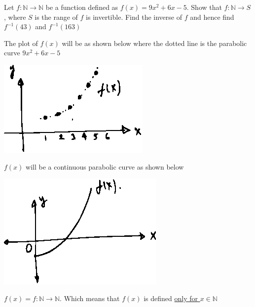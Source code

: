 \documentclass[14pt,fleqn]{extarticle}
\newcommand\N{\mathbb{N}}
\newcommand\fx{9x^2+6x-5}
\begin{document}
 
\begin{question}
	\statement 

Let $f:\N\to\N$ be a function defined as $f(x) = \fx$. Show that 
$f:\N\to S$, where $S$ is the range of $f$ is invertible. Find the 
inverse of $f$ and hence find $f^{-1}(43)$ and $f^{-1}(163)$ 
      
      \begin{step}
  \begin{options} 
     \correct 
       
       The plot of $f(x)$ will be as shown below where the dotted line 
       is the parabolic curve $\fx$ 
       
       \begin{center}
\includegraphics[scale=1.5]{1427-C.eps}
\end{center}
       
     \incorrect
     
     $f(x)$ will be a continuous parabolic curve as shown below 
     
     \begin{center}
\includegraphics[scale=1.5]{1427-A.eps}
\end{center}
        
    \end{options} 
     \reason 
     
     $f(x) = f:\N\to\N$. Which means that $f(x)$ is defined \underline{only for $x\in\N$}\newline 
     

\end{step}
\end{question}
\end{document}
